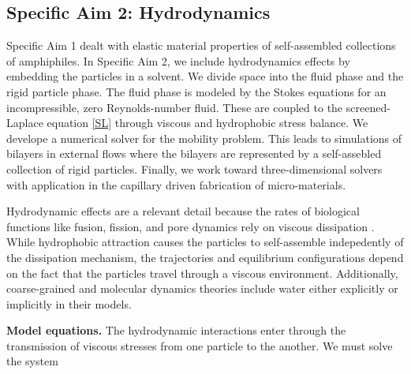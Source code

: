 \subsection{Specific Aim 2: Hydrodynamics}
\label{subsec:specific_aim_2}
Specific Aim 1 dealt with elastic material properties of self-assembled collections of amphiphiles.
In Specific Aim 2, we include hydrodynamics effects by embedding the particles in a solvent. 
We divide space into the fluid phase and the rigid particle phase.
The fluid phase is modeled by the Stokes equations for an incompressible, zero Reynolds-number fluid. These are coupled to the screened-Laplace equation \eqref{SL}
through viscous and hydrophobic stress balance.
We develope a numerical solver for the mobility problem. 
This leads to simulations of bilayers in external flows where the bilayers are represented by a self-assebled collection of rigid particles.
Finally, we work toward three-dimensional solvers with application in the capillary driven fabrication of micro-materials. 

Hydrodynamic effects are a relevant detail 
because the rates of biological functions like fusion, fission, and pore dynamics rely on viscous dissipation \cite{RYHAM20112929}. 
While hydrophobic attraction causes the particles to self-assemble indepedently of the dissipation mechanism, the trajectories and
equilibrium configurations depend on the fact that the particles travel through a viscous environment. 
Additionally, coarse-grained and molecular dynamics theories include water either explicitly or implicitly in their models. 



\textbf{Model equations.}
The hydrodynamic interactions enter through the transmission of viscous stresses from one particle to the another.  
We must solve the system 
\setcounter{midequation}{\theequation}
\addtocounter{midequation}{2}

